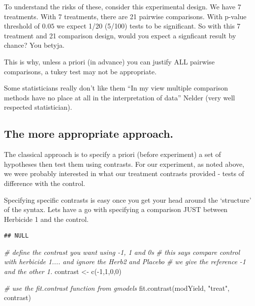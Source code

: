 \documentclass[
]{book}
\newenvironment{Shaded}{\begin{snugshade}}{\end{snugshade}}
\newcommand{\CommentTok}[1]{\textcolor[rgb]{0.56,0.35,0.01}{\textit{#1}}}
\newcommand{\DecValTok}[1]{\textcolor[rgb]{0.00,0.00,0.81}{#1}}
\newcommand{\FunctionTok}[1]{\textcolor[rgb]{0.00,0.00,0.00}{#1}}
\newcommand{\NormalTok}[1]{#1}
\newcommand{\OtherTok}[1]{\textcolor[rgb]{0.56,0.35,0.01}{#1}}
\newcommand{\SpecialCharTok}[1]{\textcolor[rgb]{0.00,0.00,0.00}{#1}}
\newcommand{\StringTok}[1]{\textcolor[rgb]{0.31,0.60,0.02}{#1}}
\begin{document}
To understand the risks of these, consider this experimental design. We have 7 treatments. With 7 treatments, there are 21 pairwise comparisons. With p-value threshold of \(0.05\) we expect 1/20 (5/100) tests to be significant. So with this 7 treatment and 21 comparison design, would you expect a signficant result by chance? You betyja.

This is why, unless a priori (in advance) you can justify ALL pairwise comparisons, a tukey test may not be appropriate.

Some statisticians really don't like them ``In my view multiple comparison methods have no place at all in the interpretation of data'' Nelder (very well respected statistician).

\hypertarget{the-more-appropriate-approach.}{%
\subsection{The more appropriate approach.}\label{the-more-appropriate-approach.}}

The classical approach is to specify a priori (before experiment) a set of hypotheses then test them using contrasts. For our experiment, as noted above, we were probably interested in what our treatment contrasts provided - tests of difference with the control.

Specifying specific contrasts is easy once you get your head around the `structure' of the syntax. Lets have a go with specifying a comparison JUST between Herbicide 1 and the control.

\begin{Shaded}
\end{Shaded}

\begin{verbatim}
## NULL
\end{verbatim}

\begin{Shaded}
\begin{Highlighting}[]
\CommentTok{\# define the contrast you want using {-}1, 1 and 0\textquotesingle{}s}
\CommentTok{\# this says compare control with herbicide 1.... and ignore the Herb2 and Placebo}
\CommentTok{\# we give the reference {-}1 and the \textquotesingle{}other\textquotesingle{} 1.}
\NormalTok{contrast }\OtherTok{\textless{}{-}} \FunctionTok{c}\NormalTok{(}\SpecialCharTok{{-}}\DecValTok{1}\NormalTok{,}\DecValTok{1}\NormalTok{,}\DecValTok{0}\NormalTok{,}\DecValTok{0}\NormalTok{)}

\CommentTok{\# use the fit.contrast function from gmodels}
\FunctionTok{fit.contrast}\NormalTok{(modYield, }\StringTok{"treat"}\NormalTok{, contrast)}
\end{Highlighting}
\end{Shaded}
\end{document}
